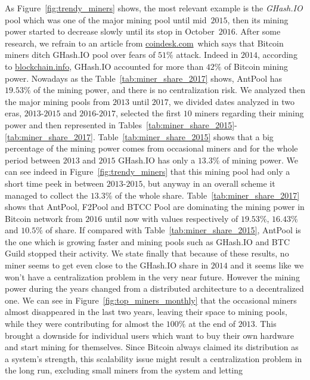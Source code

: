 \documentclass[USenglish]{uit-thesis}
\begin{document}
As Figure~\ref{fig:trendy_miners} shows, the most relevant example is the \emph{GHash.IO}
pool which was one of the major mining
pool until mid~$2015$, then its mining power started to decrease
slowly until its stop in October~$2016$. After some research,
we refrain to an article from \url{coindesk.com}\,\cite{coindesk_ghash_ditched}
which says that Bitcoin miners ditch GHash.IO pool over
fears of $51\%$ attack. Indeed in $2014$, according to \url{blockchain.info},
GHash.IO accounted for more than $42\%$ of Bitcoin mining power.
Nowadays as the Table~\ref{tab:miner_share_2017} shows, AntPool has $19.53\%$ of
the mining power, and there is no centralization risk.
We analyzed then the major mining pools from $2013$ until $2017$, we divided
dates analyzed in two eras, $2013$-$2015$ and $2016$-$2017$,
selected the first $10$ miners regarding their mining power and then 
represented in Tables~\ref{tab:miner_share_2015}-\ref{tab:miner_share_2017}.
Table~\ref{tab:miner_share_2015} shows that a big percentage of the mining
power comes from occasional miners and for the whole period
between $2013$ and $2015$ GHash.IO has only a $13.3\%$ of
mining power. We can see indeed in Figure~\ref{fig:trendy_miners}
that this mining pool had only a short time peek in between $2013$-$2015$,
but anyway in an overall scheme it managed to collect the $13.3\%$
of the whole share. Table~\ref{tab:miner_share_2017} shows that
AntPool, F2Pool and BTCC Pool are dominating the mining
power in Bitcoin network from $2016$ until now with values
respectively of $19.53\%$, $16.43\%$ and $10.5\%$ of share.
If compared with Table~\ref{tab:miner_share_2015}, AntPool
is the one which is growing faster and mining
pools such as GHash.IO and BTC Guild stopped their activity.
We state finally that because of these results, no miner seems to get
even close to the GHash.IO share in $2014$ and it
seems like we won't have
a centralization problem in the very near future.
However the mining power during the years
changed from a distributed architecture to a decentralized one.
We can see in Figure~\ref{fig:top_miners_monthly} that the
occasional miners almost disappeared in the last two years,
leaving their space to mining pools, while they were contributing
for almost the $100\%$ at the end of $2013$. This brought a
downside for individual users which want to buy
their own hardware and start mining for themselves.
Since Bitcoin always claimed its distribution as a 
system's strength, this scalability issue
might result a centralization problem in the long run,
excluding small miners from the system and letting
\end{document}
